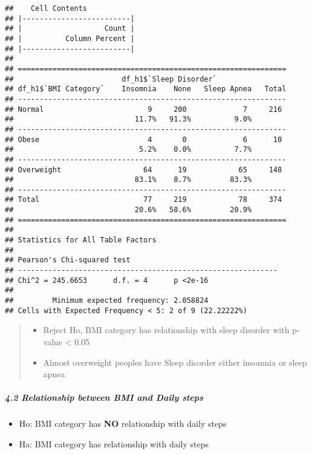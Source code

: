 \documentclass[
]{article}
\providecommand{\tightlist}{%
  \setlength{\itemsep}{0pt}\setlength{\parskip}{0pt}}
\begin{document}
\begin{verbatim}
##    Cell Contents 
## |-------------------------|
## |                   Count | 
## |          Column Percent | 
## |-------------------------|
## 
## ==============================================================
##                         df_h1$`Sleep Disorder`
## df_h1$`BMI Category`    Insomnia    None   Sleep Apnea   Total
## --------------------------------------------------------------
## Normal                        9     200             7     216 
##                            11.7%   91.3%          9.0%        
## --------------------------------------------------------------
## Obese                         4       0             6      10 
##                             5.2%    0.0%          7.7%        
## --------------------------------------------------------------
## Overweight                   64      19            65     148 
##                            83.1%    8.7%         83.3%        
## --------------------------------------------------------------
## Total                        77     219            78     374 
##                            20.6%   58.6%         20.9%        
## ==============================================================
## 
## Statistics for All Table Factors
## 
## Pearson's Chi-squared test 
## ------------------------------------------------------------
## Chi^2 = 245.6653      d.f. = 4      p <2e-16 
## 
##         Minimum expected frequency: 2.058824 
## Cells with Expected Frequency < 5: 2 of 9 (22.22222%)
\end{verbatim}

\begin{quote}
\begin{itemize}
\item
  Reject Ho, BMI category has relationship with sleep disorder with
  p-value \textless{} 0.05
\item
  Almost overweight peoples have Sleep disorder either insomnia or sleep
  apnea
\end{itemize}
\end{quote}

\hypertarget{relationship-between-bmi-and-daily-steps}{%
\subparagraph{4.2 Relationship between BMI and Daily
steps}\label{relationship-between-bmi-and-daily-steps}}

\begin{itemize}
\tightlist
\item
  Ho: BMI category has \textbf{NO} relationship with daily steps
\item
  Ha: BMI category has relationship with daily steps
\end{itemize}
\end{document}
